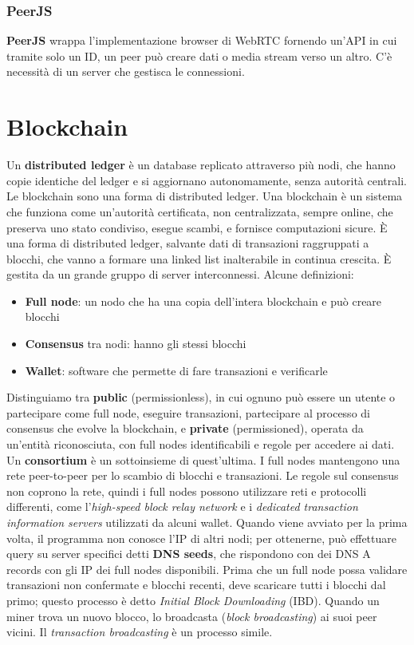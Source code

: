 \documentclass[11pt]{article}
\begin{document}
\subsubsection{PeerJS} \textbf{PeerJS} wrappa l'implementazione browser di WebRTC fornendo un'API in cui tramite solo un ID, un peer può creare dati o media stream verso un altro. C'è necessità di un server che gestisca le connessioni.

\section{Blockchain}
Un \textbf{distributed ledger} è un database replicato attraverso più nodi, che hanno copie identiche del ledger e si aggiornano autonomamente, senza autorità centrali. Le blockchain sono una forma di distributed ledger. Una blockchain è un sistema che funziona come un'autorità certificata, non centralizzata, sempre online, che preserva uno stato condiviso, esegue scambi, e fornisce computazioni sicure. È una forma di distributed ledger, salvante dati di transazioni raggruppati a blocchi, che vanno a formare una linked list inalterabile in continua crescita. È gestita da un grande gruppo di server interconnessi. Alcune definizioni:
\begin{itemize}
    \item \textbf{Full node}: un nodo che ha una copia dell'intera blockchain e può creare blocchi
    \item \textbf{Consensus} tra nodi: hanno gli stessi blocchi 
    \item \textbf{Wallet}: software che permette di fare transazioni e verificarle
\end{itemize}
Distinguiamo tra \textbf{public} (permissionless), in cui ognuno può essere un utente o partecipare come full node, eseguire transazioni, partecipare al processo di consensus che evolve la blockchain, e \textbf{private} (permissioned), operata da un'entità riconosciuta, con full nodes identificabili e regole per accedere ai dati. Un \textbf{consortium} è un sottoinsieme di quest'ultima.
I full nodes mantengono una rete peer-to-peer per lo scambio di blocchi e transazioni. Le regole sul consensus non coprono la rete, quindi i full nodes possono utilizzare reti e protocolli differenti, come l'\textit{high-speed block relay network} e i \textit{dedicated transaction information servers} utilizzati da alcuni wallet. Quando viene avviato per la prima volta, il programma non conosce l'IP di altri nodi; per ottenerne, può effettuare query su server specifici detti \textbf{DNS seeds}, che rispondono con dei DNS A records con gli IP dei full nodes disponibili. Prima che un full node possa validare transazioni non confermate e blocchi recenti, deve scaricare tutti i blocchi dal primo; questo processo è detto \textit{Initial Block Downloading} (IBD). Quando un miner trova un nuovo blocco, lo broadcasta (\textit{block broadcasting}) ai suoi peer vicini. Il \textit{transaction broadcasting} è un processo simile.
\end{document}
